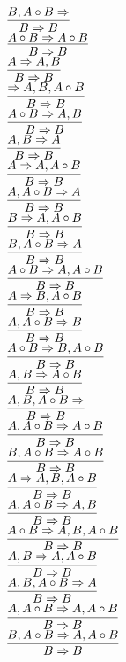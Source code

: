 \documentclass[11pt]{article}
\begin{document}
\begin{center}
\bigskip
\\$\infer{B\Rightarrow B}{B, A\circ B\Rightarrow }$
\bigskip
\\$\infer{B\Rightarrow B}{A\circ B\Rightarrow A\circ B}$
\bigskip
\\$\infer{B\Rightarrow B}{A\Rightarrow A, B}$
\bigskip
\\$\infer{B\Rightarrow B}{\Rightarrow A, B, A\circ B}$
\bigskip
\\$\infer{B\Rightarrow B}{A\circ B\Rightarrow A, B}$
\bigskip
\\$\infer{B\Rightarrow B}{A, B\Rightarrow A}$
\bigskip
\\$\infer{B\Rightarrow B}{A\Rightarrow A, A\circ B}$
\bigskip
\\$\infer{B\Rightarrow B}{A, A\circ B\Rightarrow A}$
\bigskip
\\$\infer{B\Rightarrow B}{B\Rightarrow A, A\circ B}$
\bigskip
\\$\infer{B\Rightarrow B}{B, A\circ B\Rightarrow A}$
\bigskip
\\$\infer{B\Rightarrow B}{A\circ B\Rightarrow A, A\circ B}$
\bigskip
\\$\infer{B\Rightarrow B}{A\Rightarrow B, A\circ B}$
\bigskip
\\$\infer{B\Rightarrow B}{A, A\circ B\Rightarrow B}$
\bigskip
\\$\infer{B\Rightarrow B}{A\circ B\Rightarrow B, A\circ B}$
\bigskip
\\$\infer{B\Rightarrow B}{A, B\Rightarrow A\circ B}$
\bigskip
\\$\infer{B\Rightarrow B}{A, B, A\circ B\Rightarrow }$
\bigskip
\\$\infer{B\Rightarrow B}{A, A\circ B\Rightarrow A\circ B}$
\bigskip
\\$\infer{B\Rightarrow B}{B, A\circ B\Rightarrow A\circ B}$
\bigskip
\\$\infer{B\Rightarrow B}{A\Rightarrow A, B, A\circ B}$
\bigskip
\\$\infer{B\Rightarrow B}{A, A\circ B\Rightarrow A, B}$
\bigskip
\\$\infer{B\Rightarrow B}{A\circ B\Rightarrow A, B, A\circ B}$
\bigskip
\\$\infer{B\Rightarrow B}{A, B\Rightarrow A, A\circ B}$
\bigskip
\\$\infer{B\Rightarrow B}{A, B, A\circ B\Rightarrow A}$
\bigskip
\\$\infer{B\Rightarrow B}{A, A\circ B\Rightarrow A, A\circ B}$
\bigskip
\\$\infer{B\Rightarrow B}{B, A\circ B\Rightarrow A, A\circ B}$

\end{center}
\end{document}
